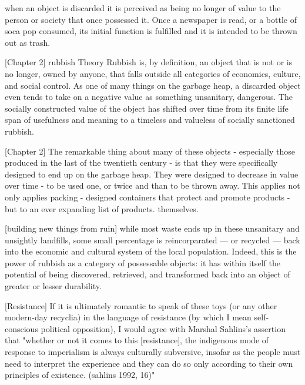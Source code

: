  when an object is discarded it is perceived as being no longer of value to the person or society that once possessed it. Once a newspaper is read, or a bottle of soca pop consumed, its initial function is fulfilled and it is intended to be thrown out as trash.

[Chapter 2] rubbish Theory  Rubbish is, by definition, an object that is not or is no longer, owned by anyone, that falls outside all categories of economics, culture, and social control. As one of many things on the garbage heap, a discarded object even tends to take on a negative value as something unsanitary, dangerous. The socially constructed value of the object has shifted over time from its finite life span of usefulness and meaning to a timeless and valueless of socially sanctioned rubbish. 

[Chapter 2]  The remarkable thing about many of these objects - especially those produced in the last of the twentieth century - is that they were specifically designed to end up on the garbage heap. They were designed to decrease in value over time - to be used one, or twice and than to be thrown away. This applies not only applies packing - designed containers that protect and promote products - but to an ever expanding list of products. themselves. 

[building new things from ruin]  while most waste ends up in these unsanitary and unsightly landfills, some small percentage is reincorparated --- or recycled --- back into the economic and cultural system of the local population. Indeed, this is the power of rubbish as a category of possessable objects: it has within itself the potential of being discovered, retrieved, and transformed back into an object of greater or lesser durability. 

[Resistance]  If it is ultimately romantic to speak of these toys (or any other modern-day recyclia) in the language of resistance (by which I mean self-conscious political opposition), I would agree with Marshal Sahlins's assertion that "whether or not it comes to this [resistance], the indigenous mode of response to imperialism is always culturally subversive, insofar as the people must need to interpret the experience and they can do so only according to their own principles of existence. (sahlins 1992, 16)"

